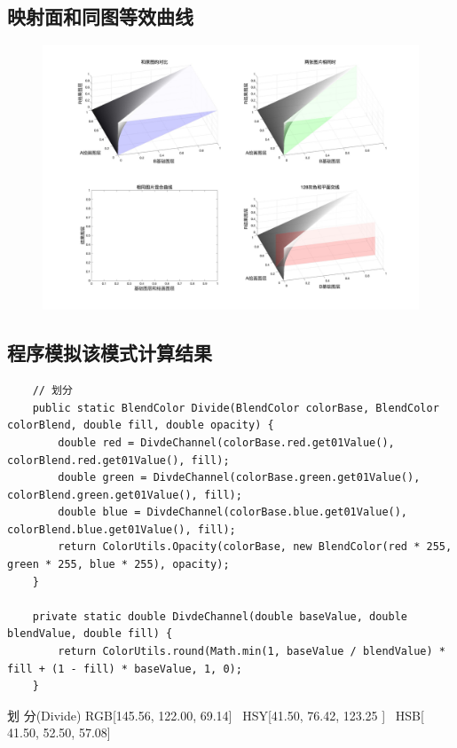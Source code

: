 \subsection{ 映射面和同图等效曲线}
\begin{figure}[h!]
	\centering
	\includegraphics[width=\linewidth]{figure/划分}
	\caption{}
	\label{fig:划分}
\end{figure}


\subsection{ 程序模拟该模式计算结果}

\begin{lstlisting}
	// 划分
	public static BlendColor Divide(BlendColor colorBase, BlendColor colorBlend, double fill, double opacity) {
		double red = DivdeChannel(colorBase.red.get01Value(), colorBlend.red.get01Value(), fill);
		double green = DivdeChannel(colorBase.green.get01Value(), colorBlend.green.get01Value(), fill);
		double blue = DivdeChannel(colorBase.blue.get01Value(), colorBlend.blue.get01Value(), fill);
		return ColorUtils.Opacity(colorBase, new BlendColor(red * 255, green * 255, blue * 255), opacity);
	}
	
	private static double DivdeChannel(double baseValue, double blendValue, double fill) {
		return ColorUtils.round(Math.min(1, baseValue / blendValue) * fill + (1 - fill) * baseValue, 1, 0);
	}
\end{lstlisting}


\begin{result}
\item 划    分(Divide)        RGB[145.56, 122.00,  69.14]~ HSY[41.50,  76.42, 123.25 ]~ HSB[ 41.50,  52.50,  57.08]
\end{result}

